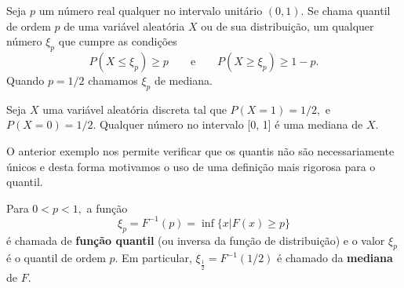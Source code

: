 \begin{frame}
	\begin{defi}[Quantil]
		
		Seja $p$ um número real qualquer no intervalo unitário $(0, 1)$. Se chama quantil de ordem $p$ de uma variável aleatória $X$
		ou de sua distribuição, um qualquer número $\xi_p$ que cumpre as condições
		$$ P (X \leq \xi_p ) \geq p \qquad \text{e} \qquad P (X \geq \xi_p ) \geq 1 - p. $$
		Quando $p=1/2$ chamamos $\xi_p$ de mediana.
	\end{defi}
	
	
	\begin{exem} 
		Seja $X$ uma variável aleatória discreta tal que $P (X = 1) = 1/2,$ e $P (X = 0) = 1/2.$ Qualquer número no intervalo [0, 1] é uma mediana de $X.$
	\end{exem}
	O anterior exemplo nos permite verificar que os quantis não são necessariamente únicos e desta forma motivamos o uso de uma definição mais rigorosa para o quantil.
	
	\begin{defi}
		Para $0<p<1,$ a função 
		\begin{equation}
		\label{fquantil}
		\xi_p=F^{-1}(p)=\inf\{x |F(x)\geq p\}
		\end{equation}
		é chamada de {\bf função quantil} (ou inversa da função de distribuição) e 
		o valor $\xi_p$ é o quantil de ordem $p.$ 
		Em particular, $\xi_{\frac{1}{2}}=  F^{-1}(1/2)$ é chamado da \textbf{mediana} de $F$. 
	\end{defi}
	
	
\end{frame}

